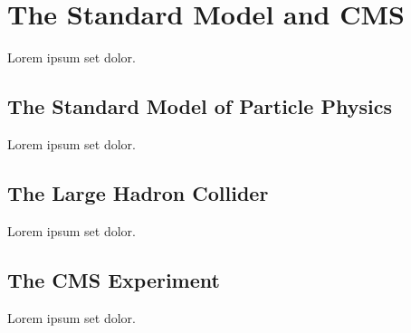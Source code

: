 \chapter{The Standard Model and CMS}
Lorem ipsum set dolor.

\section{The Standard Model of Particle Physics}
Lorem ipsum set dolor.

\section{The Large Hadron Collider}
Lorem ipsum set dolor.

\section{The CMS Experiment}
Lorem ipsum set dolor.